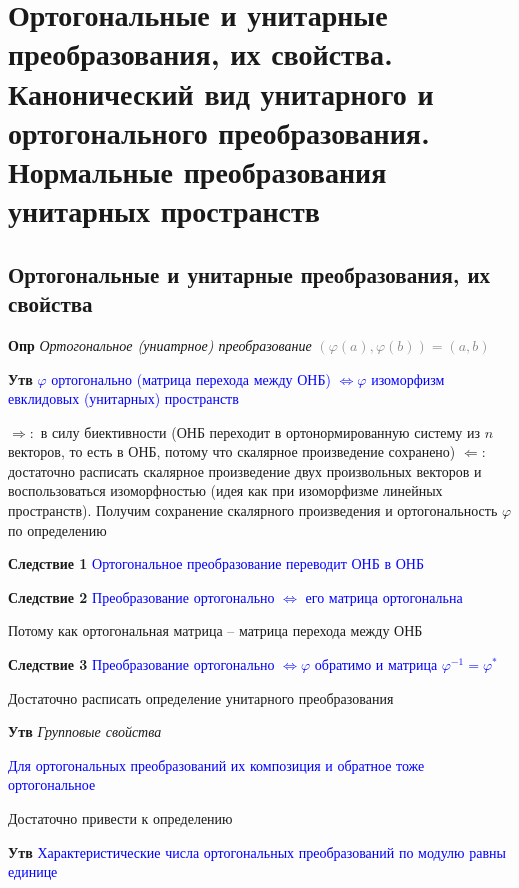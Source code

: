 \documentclass[a4paper, 14pt]{article}
\begin{document}
    \section{Ортогональные и унитарные преобразования, их свойства.
    Канонический вид унитарного и ортогонального преобразования.
    Нормальные преобразования унитарных пространств}
    
    \subsection{Ортогональные и унитарные преобразования, их свойства}
    
    \textbf{Опр} \textit{Ортогональное (униатрное) преобразование} \textcolor{gray}{$(\varphi (a), \varphi (b)) = (a, b)$}
    
    \textbf{Утв} \textcolor{blue}{$\varphi$ ортогонально (матрица перехода между ОНБ) $\Leftrightarrow \varphi$
        изоморфизм евклидовых (унитарных) пространств}
    
    $\Rightarrow:$ в силу биективности (ОНБ переходит в ортонормированную систему из $n$ векторов, то есть в ОНБ,
    потому что скалярное произведение сохранено)
    $\Leftarrow:$ достаточно расписать скалярное произведение двух произвольных векторов и воспользоваться
    изоморфностью (идея как при изоморфизме линейных пространств).
    Получим сохранение скалярного произведения и ортогональность $\varphi$ по определению
    
    \textbf{Следствие 1} \textcolor{blue}{Ортогональное преобразование переводит ОНБ в ОНБ}
    
    \textbf{Следствие 2} \textcolor{blue}{Преобразование ортогонально $\Leftrightarrow$ его матрица ортогональна}
    
    Потому как ортогональная матрица -- матрица перехода между ОНБ
    
    \textbf{Следствие 3} \textcolor{blue}{Преобразование ортогонально $\Leftrightarrow \varphi$ обратимо и
    матрица $\varphi^{-1} = \varphi^*$}
    
    Достаточно расписать определение унитарного преобразования
    
    \textbf{Утв} \textit{Групповые свойства}
    
    \textcolor{blue}{Для ортогональных преобразований их композиция и обратное тоже ортогональное}
    
    Достаточно привести к определению
    
    \textbf{Утв} \textcolor{blue}{Характеристические числа ортогональных преобразований по модулю равны единице}
    
\end{document}
